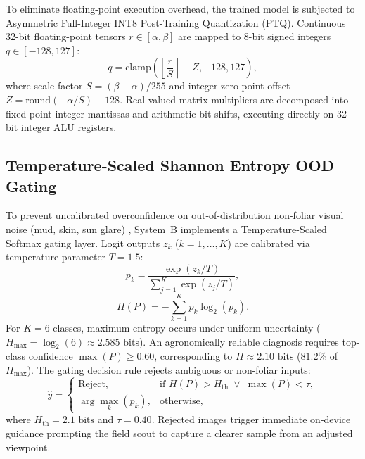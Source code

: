 \documentclass[conference,a4paper]{IEEEtran}
\begin{document}
To eliminate floating-point execution overhead, the trained model is subjected to Asymmetric Full-Integer INT8 Post-Training Quantization (PTQ). Continuous 32-bit floating-point tensors $r \in [\alpha, \beta]$ are mapped to 8-bit signed integers $q \in [-128, 127]$:
\begin{equation}
q = \text{clamp}\left( \left\lfloor \frac{r}{S} \right\rceil + Z, -128, 127 \right),
\label{eq:quant}
\end{equation}
where scale factor $S = (\beta - \alpha)/255$ and integer zero-point offset $Z = \text{round}(-\alpha/S) - 128$. Real-valued matrix multipliers are decomposed into fixed-point integer mantissas and arithmetic bit-shifts, executing directly on 32-bit integer ALU registers.

\subsection{Temperature-Scaled Shannon Entropy OOD Gating}
To prevent uncalibrated overconfidence on out-of-distribution non-foliar visual noise (mud, skin, sun glare) \cite{b19}, System~B implements a Temperature-Scaled Softmax gating layer. Logit outputs $z_k$ ($k=1,\dots,K$) are calibrated via temperature parameter $T = 1.5$:
\begin{equation}
p_k = \frac{\exp(z_k / T)}{\sum_{j=1}^K \exp(z_j / T)},
\label{eq:temp_softmax}
\end{equation}
\begin{equation}
H(P) = -\sum_{k=1}^K p_k \log_2(p_k).
\label{eq:entropy}
\end{equation}
For $K=6$ classes, maximum entropy occurs under uniform uncertainty ($H_{\max} = \log_2(6) \approx 2.585\text{ bits}$). An agronomically reliable diagnosis requires top-class confidence $\max(P) \ge 0.60$, corresponding to $H \approx 2.10\text{ bits}$ ($81.2\%$ of $H_{\max}$). The gating decision rule rejects ambiguous or non-foliar inputs:
\begin{equation}
\hat{y} = 
\begin{cases}
\text{Reject}, & \text{if } H(P) > H_{\text{th}} \;\vee\; \max(P) < \tau, \\
\arg\max_k(p_k), & \text{otherwise},
\end{cases}
\label{eq:rejection}
\end{equation}
where $H_{\text{th}} = 2.1\text{ bits}$ and $\tau = 0.40$. Rejected images trigger immediate on-device guidance prompting the field scout to capture a clearer sample from an adjusted viewpoint.
\end{document}
